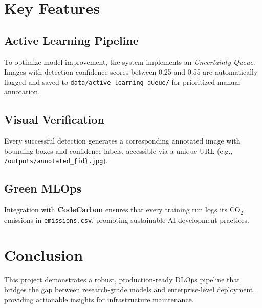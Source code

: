 \documentclass[12pt,a4paper]{article}
\begin{document}
\section{Key Features}
\subsection{Active Learning Pipeline}
To optimize model improvement, the system implements an \textit{Uncertainty Queue}. Images with detection confidence scores between 0.25 and 0.55 are automatically flagged and saved to \texttt{data/active\_learning\_queue/} for prioritized manual annotation.

\subsection{Visual Verification}
Every successful detection generates a corresponding annotated image with bounding boxes and confidence labels, accessible via a unique URL (e.g., \texttt{/outputs/annotated\_\{id\}.jpg}).

\subsection{Green MLOps}
Integration with \textbf{CodeCarbon} ensures that every training run logs its CO$_2$ emissions in \texttt{emissions.csv}, promoting sustainable AI development practices.

\section{Conclusion}
This project demonstrates a robust, production-ready DLOps pipeline that bridges the gap between research-grade models and enterprise-level deployment, providing actionable insights for infrastructure maintenance.
\end{document}
